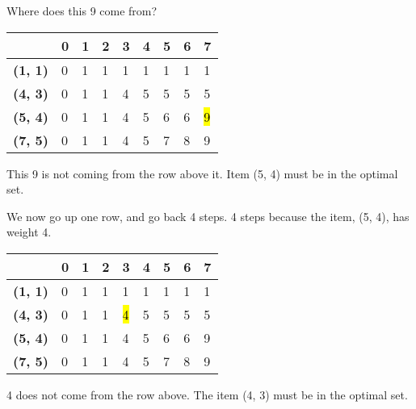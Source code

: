 \documentclass{article}
\begin{document}
Where does this 9 come from?
\begin{center}
\begin{tabular}{|l|l|l|l|l|l|l|l|l|}
\hline
                & \textbf{0} & \textbf{1} & \textbf{2} & \textbf{3} & \textbf{4} & \textbf{5} & \textbf{6} & \textbf{7} \\ \hline
\textbf{(1, 1)} & 0          &1            &1            &1            &1            &1            &1            &1            \\ \hline
\textbf{(4, 3)} & 0          &1            &1            &4            &5            &5            &  5          &  5          \\ \hline
\textbf{(5, 4)} & 0          &1            &1            &4            &5            &6            &6            & \hl{9}           \\ \hline
\textbf{(7, 5)} & 0          & 1           & 1           &   4         &   5         &7            & 8           &9            \\ \hline
\end{tabular}
\end{center}
This 9 is not coming from the row above it. Item (5, 4) must be in the optimal set.

We now go up one row, and go back 4 steps. 4 steps because the item, (5, 4), has weight 4.
\begin{center}
\begin{tabular}{|l|l|l|l|l|l|l|l|l|}
\hline
                & \textbf{0} & \textbf{1} & \textbf{2} & \textbf{3} & \textbf{4} & \textbf{5} & \textbf{6} & \textbf{7} \\ \hline
\textbf{(1, 1)} & 0          &1            &1            &1            &1            &1            &1            &1            \\ \hline
\textbf{(4, 3)} & 0          &1            &1            &\hl{4}            &5            &5            &  5          &  5          \\ \hline
\textbf{(5, 4)} & 0          &1            &1            &4            &5            &6            &6            & 9           \\ \hline
\textbf{(7, 5)} & 0          & 1           & 1           &   4         &   5         &7            & 8           &9            \\ \hline
\end{tabular}
\end{center}
4 does not come from the row above. The item (4, 3) must be in the optimal set.
\end{document}
